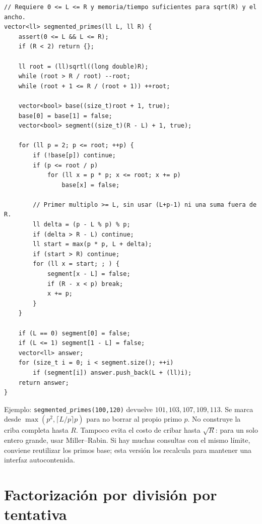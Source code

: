 \begin{lstlisting}[style=cpp]
// Requiere 0 <= L <= R y memoria/tiempo suficientes para sqrt(R) y el ancho.
vector<ll> segmented_primes(ll L, ll R) {
    assert(0 <= L && L <= R);
    if (R < 2) return {};

    ll root = (ll)sqrtl((long double)R);
    while (root > R / root) --root;
    while (root + 1 <= R / (root + 1)) ++root;

    vector<bool> base((size_t)root + 1, true);
    base[0] = base[1] = false;
    vector<bool> segment((size_t)(R - L) + 1, true);

    for (ll p = 2; p <= root; ++p) {
        if (!base[p]) continue;
        if (p <= root / p)
            for (ll x = p * p; x <= root; x += p)
                base[x] = false;

        // Primer multiplo >= L, sin usar (L+p-1) ni una suma fuera de R.
        ll delta = (p - L % p) % p;
        if (delta > R - L) continue;
        ll start = max(p * p, L + delta);
        if (start > R) continue;
        for (ll x = start; ; ) {
            segment[x - L] = false;
            if (R - x < p) break;
            x += p;
        }
    }

    if (L == 0) segment[0] = false;
    if (L <= 1) segment[1 - L] = false;
    vector<ll> answer;
    for (size_t i = 0; i < segment.size(); ++i)
        if (segment[i]) answer.push_back(L + (ll)i);
    return answer;
}
\end{lstlisting}

Ejemplo: \texttt{segmented\_primes(100,120)} devuelve
$101,103,107,109,113$. Se marca desde
$\max(p^2,\lceil L/p\rceil p)$ para no borrar al propio primo $p$.
No construye la criba completa hasta $R$. Tampoco evita el costo de cribar
hasta $\sqrt R$: para un solo entero grande, usar Miller--Rabin.
Si hay muchas consultas con el mismo l\'imite, conviene reutilizar los primos
base; esta versi\'on los recalcula para mantener una interfaz autocontenida.

\section{Factorizaci\'on por divisi\'on por tentativa}

